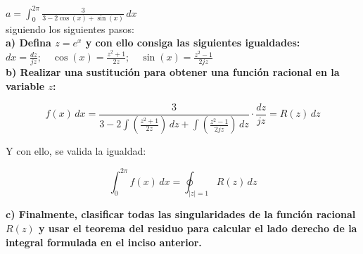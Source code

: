 \documentclass[12pt]{report}
\begin{document}
$a = \int_{0}^{2\pi} \frac{3}{3 - 2\cos(x) + \sin(x)} \, dx$\\[6pt]

siguiendo los siguientes pasos:\\[6pt]

\textbf{a)  Defina $z = e^{x}$ y con ello consiga las siguientes igualdades:}\\[6pt]

$dx = \frac{dz}{jz}; \quad \cos(x) = \frac{z^{2} + 1}{2z}; \quad \sin(x) = \frac{z^{2} - 1}{2jz}$\\[6pt]

\textbf{b)  Realizar una sustitución para obtener una función racional en la variable \( z \):}

$$ f(x) \, dx = \frac{3}{3 - 2\int \left( \frac{z^{2} + 1}{2z} \right) \, dz + \int \left( \frac{z^{2} - 1}{2jz} \right) \, dz} \cdot \frac{dz}{jz} = R(z) \, dz $$ 

Y con ello, se valida la igualdad:

$$ \int_{0}^{2\pi} f(x) \, dx = \oint_{|z|=1} R(z) \, dz$$ 


\textbf{c)  Finalmente, clasificar todas las singularidades de la función racional $R(z)$ y usar el teorema del residuo para calcular el lado derecho de la integral formulada en el inciso anterior.}
\end{document}
